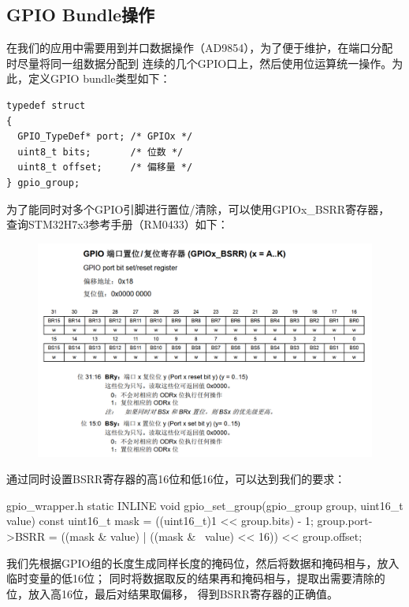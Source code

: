 \subsection{GPIO Bundle操作}
在我们的应用中需要用到并口数据操作（AD9854），为了便于维护，在端口分配时尽量将同一组数据分配到
连续的几个GPIO口上，然后使用位运算统一操作。为此，定义GPIO bundle类型如下：

\begin{verbatim}
typedef struct
{
  GPIO_TypeDef* port; /* GPIOx */
  uint8_t bits;       /* 位数 */
  uint8_t offset;     /* 偏移量 */
} gpio_group;
\end{verbatim}

为了能同时对多个GPIO引脚进行置位/清除，可以使用GPIOx\_BSRR寄存器，
查询STM32H7x3参考手册（RM0433）如下：

\begin{figure}[H]
\center
    \includegraphics[width=\textwidth]{img/bsrr.png}
\end{figure}

通过同时设置BSRR寄存器的高16位和低16位，可以达到我们的要求：

\begin{cbox}{gpio\_wrapper.h}
static INLINE void
gpio_set_group(gpio_group group, uint16_t value)
{
  const uint16_t mask = ((uint16_t)1 << group.bits) - 1;
  group.port->BSRR = ((mask & value) | ((mask & ~value) << 16)) << group.offset;
}
\end{cbox}

我们先根据GPIO组的长度生成同样长度的掩码位，然后将数据和掩码相与，放入临时变量的低16位；
同时将数据取反的结果再和掩码相与，提取出需要清除的位，放入高16位，最后对结果取偏移，
得到BSRR寄存器的正确值。

